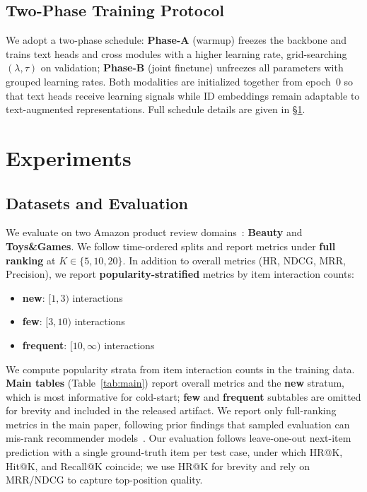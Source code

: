 \documentclass[sigconf,natbib=true,anonymous]{acmart}
\begin{document}
\subsection{Two-Phase Training Protocol}
We adopt a two-phase schedule:
\textbf{Phase-A} (warmup) freezes the backbone and trains
text heads and cross modules with a higher learning rate,
grid-searching $(\lambda,\tau)$ on validation;
\textbf{Phase-B} (joint finetune) unfreezes all parameters
with grouped learning rates.
Both modalities are initialized together from epoch~0 so that
text heads receive learning signals while ID embeddings remain
adaptable to text-augmented representations.
Full schedule details are given in \S\ref{sec:experiments}.

\section{Experiments}\label{sec:experiments}
\subsection{Datasets and Evaluation}
We evaluate on two Amazon product review domains~\cite{mcauley2015amazon,ni2019amazon}: \textbf{Beauty} and
\textbf{Toys\&Games}. We follow time-ordered splits and
report metrics under \textbf{full ranking} at $K\in\{5,10,20\}$.
In addition to overall metrics (HR, NDCG, MRR, Precision),
we report \textbf{popularity-stratified} metrics by item
interaction counts:
\begin{itemize}[leftmargin=*,itemsep=1pt]
  \item \textbf{new}: $[1,3)$ interactions
  \item \textbf{few}: $[3,10)$ interactions
  \item \textbf{frequent}: $[10,\infty)$ interactions
\end{itemize}
We compute popularity strata from item interaction counts in
the training data.
\textbf{Main tables} (Table~\ref{tab:main}) report overall metrics and the
\textbf{new} stratum, which is most informative for cold-start;
\textbf{few} and \textbf{frequent} subtables are omitted for brevity
and included in the released artifact.
We report only full-ranking metrics in the
main paper, following prior findings that sampled evaluation
can mis-rank recommender models~\cite{krichene2020sampledmetrics}. Our evaluation
follows leave-one-out next-item prediction with a single
ground-truth item per test case, under which HR@K, Hit@K, and
Recall@K coincide; we use HR@K for brevity and rely on
MRR/NDCG to capture top-position quality.
\end{document}
